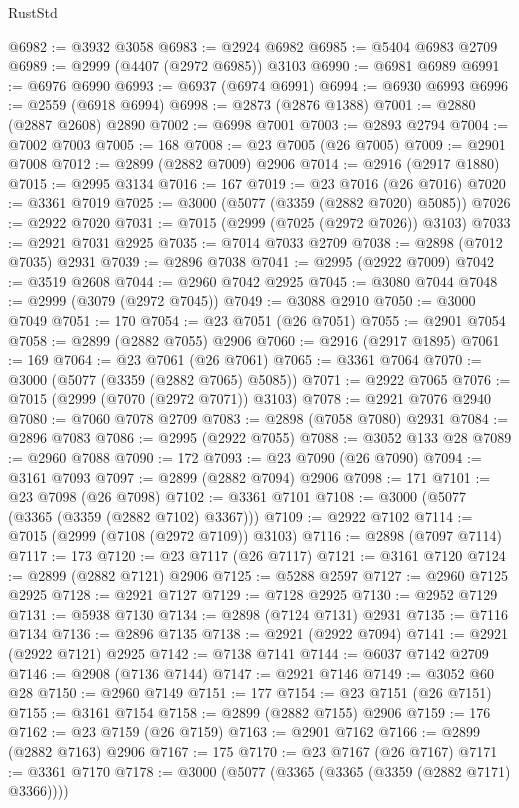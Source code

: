 \begin{lexlean}{RustStd}
\begin{coremodule}
@6982 := @3932 @3058
@6983 := @2924 @6982
@6985 := @5404 @6983 @2709
@6989 := @2999 (@4407 (@2972 @6985)) @3103
@6990 := @6981 @6989
@6991 := @6976 @6990
@6993 := @6937 (@6974 @6991)
@6994 := @6930 @6993
@6996 := @2559 (@6918 @6994)
@6998 := @2873 (@2876 @1388)
@7001 := @2880 (@2887 @2608) @2890
@7002 := @6998 @7001
@7003 := @2893 @2794
@7004 := @7002 @7003
@7005 := 168
@7008 := @23 @7005 (@26 @7005)
@7009 := @2901 @7008
@7012 := @2899 (@2882 @7009) @2906
@7014 := @2916 (@2917 @1880)
@7015 := @2995 @3134
@7016 := 167
@7019 := @23 @7016 (@26 @7016)
@7020 := @3361 @7019
@7025 := @3000 (@5077 (@3359 (@2882 @7020) @5085))
@7026 := @2922 @7020
@7031 := @7015 (@2999 (@7025 (@2972 @7026)) @3103)
@7033 := @2921 @7031 @2925
@7035 := @7014 @7033 @2709
@7038 := @2898 (@7012 @7035) @2931
@7039 := @2896 @7038
@7041 := @2995 (@2922 @7009)
@7042 := @3519 @2608
@7044 := @2960 @7042 @2925
@7045 := @3080 @7044
@7048 := @2999 (@3079 (@2972 @7045))
@7049 := @3088 @2910
@7050 := @3000 @7049
@7051 := 170
@7054 := @23 @7051 (@26 @7051)
@7055 := @2901 @7054
@7058 := @2899 (@2882 @7055) @2906
@7060 := @2916 (@2917 @1895)
@7061 := 169
@7064 := @23 @7061 (@26 @7061)
@7065 := @3361 @7064
@7070 := @3000 (@5077 (@3359 (@2882 @7065) @5085))
@7071 := @2922 @7065
@7076 := @7015 (@2999 (@7070 (@2972 @7071)) @3103)
@7078 := @2921 @7076 @2940
@7080 := @7060 @7078 @2709
@7083 := @2898 (@7058 @7080) @2931
@7084 := @2896 @7083
@7086 := @2995 (@2922 @7055)
@7088 := @3052 @133 @28
@7089 := @2960 @7088
@7090 := 172
@7093 := @23 @7090 (@26 @7090)
@7094 := @3161 @7093
@7097 := @2899 (@2882 @7094) @2906
@7098 := 171
@7101 := @23 @7098 (@26 @7098)
@7102 := @3361 @7101
@7108 := @3000 (@5077 (@3365 (@3359 (@2882 @7102) @3367)))
@7109 := @2922 @7102
@7114 := @7015 (@2999 (@7108 (@2972 @7109)) @3103)
@7116 := @2898 (@7097 @7114)
@7117 := 173
@7120 := @23 @7117 (@26 @7117)
@7121 := @3161 @7120
@7124 := @2899 (@2882 @7121) @2906
@7125 := @5288 @2597
@7127 := @2960 @7125 @2925
@7128 := @2921 @7127
@7129 := @7128 @2925
@7130 := @2952 @7129
@7131 := @5938 @7130
@7134 := @2898 (@7124 @7131) @2931
@7135 := @7116 @7134
@7136 := @2896 @7135
@7138 := @2921 (@2922 @7094)
@7141 := @2921 (@2922 @7121) @2925
@7142 := @7138 @7141
@7144 := @6037 @7142 @2709
@7146 := @2908 (@7136 @7144)
@7147 := @2921 @7146
@7149 := @3052 @60 @28
@7150 := @2960 @7149
@7151 := 177
@7154 := @23 @7151 (@26 @7151)
@7155 := @3161 @7154
@7158 := @2899 (@2882 @7155) @2906
@7159 := 176
@7162 := @23 @7159 (@26 @7159)
@7163 := @2901 @7162
@7166 := @2899 (@2882 @7163) @2906
@7167 := 175
@7170 := @23 @7167 (@26 @7167)
@7171 := @3361 @7170
@7178 := @3000 (@5077 (@3365 (@3365 (@3359 (@2882 @7171) @3366))))

\end{coremodule}
\end{lexlean}
